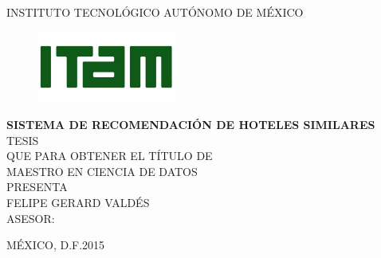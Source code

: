 \documentclass[12pt]{report}
\begin{document}
%
{\large
\begin{center}
INSTITUTO TECNOL\'OGICO AUT\'ONOMO DE M\'EXICO
\end{center}
\begin{figure}[h]
 	\centering
	\includegraphics[width=0.4\textwidth]{imagenes/logo_ITAM.jpg}
	\end{figure}
\begin{center}
\vspace{0cm}
\textbf{SISTEMA DE RECOMENDACIÓN DE HOTELES SIMILARES}\\
\vspace{1cm}
TESIS\\
\vspace{1cm}
{\normalsize QUE PARA OBTENER EL T\'ITULO DE}\\
\vspace{0.5cm}
MAESTRO EN CIENCIA DE DATOS\\
\vspace{0.5cm}
{\normalsize PRESENTA}\\
\vspace{1cm}
FELIPE GERARD VALD\'ES\\
\vspace{2cm}
{\normalsize ASESOR: }\\
\vspace{2cm}
\end{center}
\begin{flushleft}
M\'EXICO, D.F.\hfill 2015%
\end{flushleft}
}
 
\end{document}
